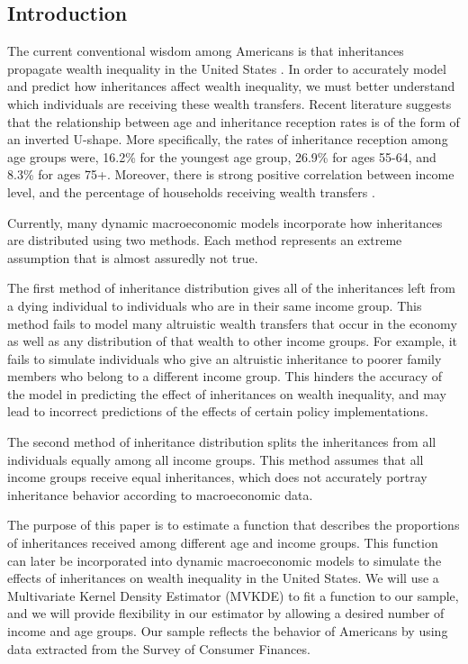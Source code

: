 \documentclass[letterpaper,12pt]{article}
\theoremstyle{definition}
\begin{document}
\begin{spacing}{1.5}

\section{Introduction}\label{SecIntro}

The current conventional wisdom among Americans is that inheritances propagate wealth inequality in the United States \citet{Wolff:2015}. In order to accurately model and predict how inheritances affect wealth inequality, we must better understand which individuals are receiving these wealth transfers. Recent literature suggests that the relationship between age and inheritance reception rates is of the form of an inverted U-shape. More specifically, the rates of inheritance reception among age groups were, 16.2\% for the youngest age group, 26.9\% for ages 55-64, and 8.3\% for ages 75+. Moreover, there is strong positive correlation between income level, and the percentage of households receiving wealth transfers \citet{Wolff:2015}.

Currently, many dynamic macroeconomic models incorporate how
inheritances are distributed using two methods. Each method represents an extreme assumption 
that is almost assuredly not true.

The first method of inheritance distribution gives all of the inheritances left from a dying 
individual to individuals who are in their same income group. This method fails to model many 
altruistic wealth transfers that occur in the economy as well as any distribution of that wealth to 
other income groups. For example, it fails to simulate individuals who give an altruistic inheritance 
to poorer family members who belong to a different income group. This hinders the accuracy of 
the model in predicting the effect of inheritances on wealth inequality, and may lead to incorrect 
predictions of the effects of certain policy implementations.

The second method of inheritance distribution splits the inheritances from all individuals 
equally among all income groups. This method assumes that all income groups receive equal 
inheritances, which does not accurately portray inheritance behavior according to macroeconomic data.

  The purpose of this paper is to estimate a function that describes the proportions of inheritances received among different age and income groups. This function can later be incorporated into dynamic macroeconomic models to simulate the effects of inheritances on wealth inequality in the United States. We will use a Multivariate Kernel Density Estimator (MVKDE) to fit a function to our sample, and we will provide flexibility in our estimator by allowing a desired number of income and age groups. Our sample reflects the behavior of Americans by using data extracted from the Survey of Consumer Finances.



\end{spacing}
\end{document}
